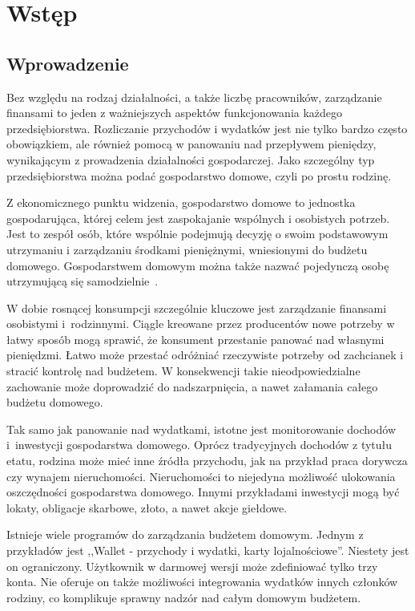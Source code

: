 \chapter{Wstęp}
\label{chap:wstep}
\section{Wprowadzenie}
\label{sec:wprowadzenie}
Bez względu na rodzaj działalności, a także liczbę pracowników, zarządzanie finansami to jeden z ważniejszych aspektów funkcjonowania każdego przedsiębiorstwa. Rozliczanie przychodów i wydatków jest nie tylko bardzo często obowiązkiem, ale również pomocą w panowaniu nad przepływem pieniędzy, wynikającym z prowadzenia działalności gospodarczej. Jako szczególny typ przedsiębiorstwa można podać gospodarstwo domowe, czyli po prostu rodzinę.

Z ekonomicznego punktu widzenia, gospodarstwo domowe to jednostka gospodarująca, której celem jest zaspokajanie wspólnych i osobistych potrzeb. Jest to zespół osób, które wspólnie podejmują decyzję o swoim podstawowym utrzymaniu i zarządzaniu środkami pieniężnymi, wniesionymi do budżetu domowego. Gospodarstwem domowym można także nazwać pojedynczą osobę utrzymującą się samodzielnie~\cite{gospodarstwo-domowe}.

W dobie rosnącej konsumpcji szczególnie kluczowe jest zarządzanie finansami osobistymi i~rodzinnymi. Ciągle kreowane przez producentów nowe potrzeby w łatwy sposób mogą sprawić, że konsument przestanie panować nad własnymi pieniędzmi. Łatwo może przestać odróżniać rzeczywiste potrzeby od zachcianek i stracić kontrolę nad budżetem. W konsekwencji takie nieodpowiedzialne zachowanie może doprowadzić do nadszarpnięcia, a nawet załamania całego budżetu domowego.

Tak samo jak panowanie nad wydatkami, istotne jest monitorowanie dochodów i~inwestycji gospodarstwa domowego. Oprócz tradycyjnych dochodów z tytułu etatu, rodzina może mieć inne źródła przychodu, jak na przykład praca dorywcza czy wynajem nieruchomości. Nieruchomości to niejedyna możliwość ulokowania oszczędności gospodarstwa domowego. Innymi przykładami inwestycji mogą być lokaty, obligacje skarbowe, złoto, a nawet akcje giełdowe.

Istnieje wiele programów do zarządzania budżetem domowym. Jednym z przykładów jest ,,Wallet - przychody i wydatki, karty lojalnościowe''. Niestety jest on ograniczony. Użytkownik w darmowej wersji może zdefiniować tylko trzy konta. Nie oferuje on także możliwości integrowania wydatków innych członków rodziny, co komplikuje sprawny nadzór nad całym domowym budżetem.

